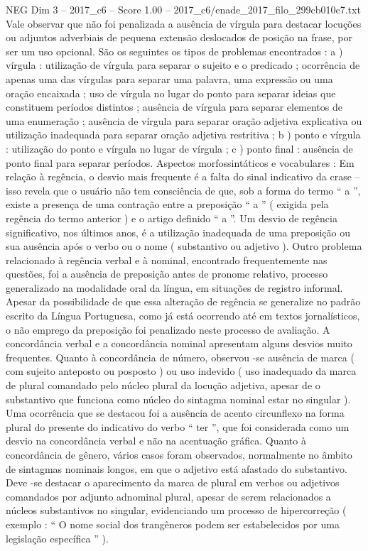 \begin{textsample}{NEG Dim 3 – 2017\_c6 – Score 1.00 – 2017\_c6/enade\_2017\_filo\_299cb010c7.txt}
Vale observar que não foi penalizada a ausência de vírgula para destacar locuções ou adjuntos adverbiais de pequena extensão deslocados de posição na frase, por ser um uso opcional.
São os seguintes os tipos de problemas encontrados : a ) vírgula : utilização de vírgula para separar o sujeito e o predicado ; ocorrência de apenas uma das vírgulas para separar uma palavra, uma expressão ou uma oração encaixada ; uso de vírgula no lugar do ponto para separar ideias que constituem períodos distintos ; ausência de vírgula para separar elementos de uma enumeração ; ausência de vírgula para separar oração adjetiva explicativa ou utilização inadequada para separar oração adjetiva restritiva ; b ) ponto e vírgula : utilização do ponto e vírgula no lugar de vírgula ; c ) ponto final : ausência de ponto final para separar períodos.
Aspectos morfossintáticos e vocabulares : Em relação à regência, o desvio mais frequente é a falta do sinal indicativo da crase – isso revela que o usuário não tem consciência de que, sob a forma do termo “ a ”, existe a presença de uma contração entre a preposição “ a ” ( exigida pela regência do termo anterior ) e o artigo definido “ a ”.
Um desvio de regência significativo, nos últimos anos, é a utilização inadequada de uma preposição ou sua ausência após o verbo ou o nome ( substantivo ou adjetivo ).
Outro problema relacionado à regência verbal e à nominal, encontrado frequentemente nas questões, foi a ausência de preposição antes de pronome relativo, processo generalizado na modalidade oral da língua, em situações de registro informal.
Apesar da possibilidade de que essa alteração de regência se generalize no padrão escrito da Língua Portuguesa, como já está ocorrendo até em textos jornalísticos, o não emprego da preposição foi penalizado neste processo de avaliação.
A concordância verbal e a concordância nominal apresentam alguns desvios muito frequentes.
Quanto à concordância de número, observou -se ausência de marca ( com sujeito anteposto ou posposto ) ou uso indevido ( uso inadequado da marca de plural comandado pelo núcleo plural da locução adjetiva, apesar de o substantivo que funciona como núcleo do sintagma nominal estar no singular ).
Uma ocorrência que se destacou foi a ausência de acento circunflexo na forma plural do presente do indicativo do verbo “ ter ”, que foi considerada como um desvio na concordância verbal e não na acentuação gráfica.
Quanto à concordância de gênero, vários casos foram observados, normalmente no âmbito de sintagmas nominais longos, em que o adjetivo está afastado do substantivo.
Deve -se destacar o aparecimento da marca de plural em verbos ou adjetivos comandados por adjunto adnominal plural, apesar de serem relacionados a núcleos substantivos no singular, evidenciando um processo de hipercorreção ( exemplo : “ O nome social dos trangêneros podem ser estabelecidos por uma legislação específica ” ).

\end{textsample}
